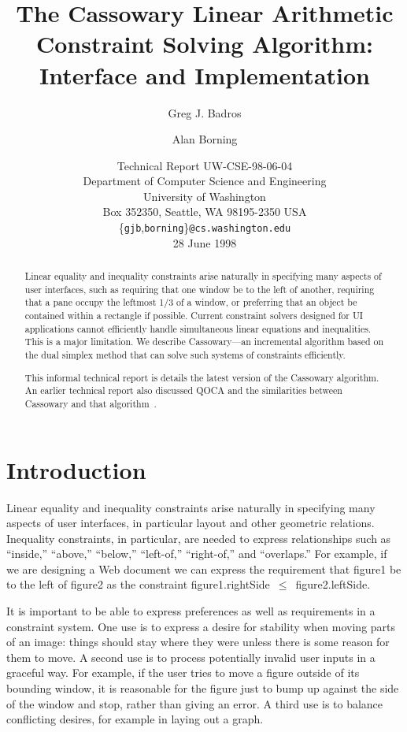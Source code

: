 \documentclass{article}
\title{The Cassowary Linear Arithmetic Constraint Solving Algorithm:
  Interface and Implementation}
\author{Greg J. Badros \and Alan Borning}
\date{Technical Report UW-CSE-98-06-04 \\
Department of Computer Science and Engineering \\
University of Washington \\
Box 352350, Seattle, WA  98195-2350  USA \\
{\small \{{\tt gjb},{\tt borning}\}{\tt @cs.washington.edu}} \\
\vspace{2mm}
28 June 1998}
\newcommand{\code}{\small\sf}
\begin{document}
\maketitle

\begin{abstract}
Linear equality and inequality constraints arise naturally in specifying
many aspects of user interfaces, such as requiring that one window be to
the left of another, requiring that a pane occupy the leftmost 1/3 of a
window, or preferring that an object be contained within a rectangle if
possible.  Current constraint solvers designed for UI applications cannot
efficiently handle simultaneous linear equations and inequalities.  This is
a major limitation.  We describe Cassowary---an incremental algorithm based on the dual
simplex method that can solve such systems of constraints
efficiently.

This informal technical report is details the latest version of the
Cassowary algorithm.  An earlier technical report also
discussed QOCA and the similarities between Cassowary and that
algorithm~\cite{borning-simplex-tr}.
\end{abstract}

\bigskip

\section{Introduction}

Linear equality and inequality constraints arise naturally in specifying
many aspects of user interfaces, in particular layout and other geometric
relations.  Inequality constraints, in particular, are needed to express
relationships such as ``inside,'' ``above,'' ``below,'' ``left-of,''
``right-of,'' and ``overlaps.''  For example, if we are designing a
Web document we can express the
requirement that {\code figure1} be to the left of {\code figure2} as the
constraint \mbox{\code figure1.rightSide $\leq$ figure2.leftSide}.

It is important to be able to express preferences as well as requirements
in a constraint system.  One use is to express a desire for stability
when moving parts of an image: things should stay where they were unless
there is some reason for them to move.  A second use is to process
potentially invalid user inputs in a graceful way.  For example, if the
user tries to move a figure outside of its bounding window, it is
reasonable for the figure just to bump up against the side of the window
and stop, rather than giving an error.  A
third use is to balance conflicting desires, for example in laying out a
graph.
\end{document}

